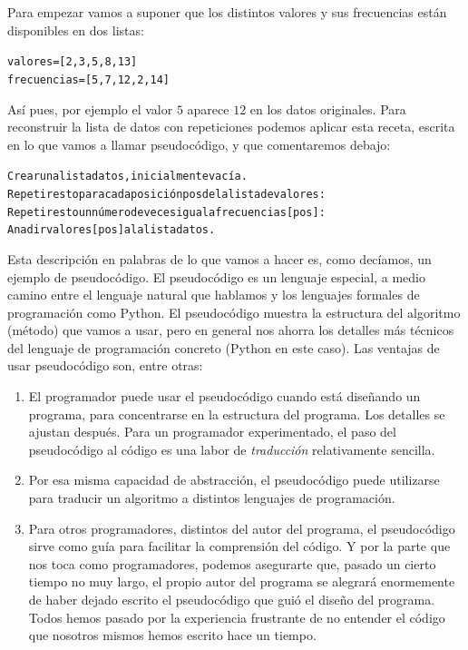 \documentclass[10pt,a4paper]{article}\usepackage[]{graphicx}\usepackage[]{color}
\makeatletter
\newenvironment{kframe}{%
 \def\at@end@of@kframe{}%
 \ifinner\ifhmode%
  \def\at@end@of@kframe{\end{minipage}}%
  \begin{minipage}{\columnwidth}%
 \fi\fi%
 \def\FrameCommand##1{\hskip\@totalleftmargin \hskip-\fboxsep
 \colorbox{shadecolor}{##1}\hskip-\fboxsep
     \hskip-\linewidth \hskip-\@totalleftmargin \hskip\columnwidth}%
 \MakeFramed {\advance\hsize-\width
   \@totalleftmargin\z@ \linewidth\hsize
   \@setminipage}}%
 {\par\unskip\endMakeFramed%
 \at@end@of@kframe}
\newenvironment{knitrout}{}{} %
\makeatother
\begin{document}
Para empezar vamos a suponer que los distintos valores y sus frecuencias están disponibles en dos listas:
\begin{knitrout}
\color{fgcolor}\begin{kframe}
\begin{alltt}
valores = [2,3,5,8,13]
frecuencias = [5,7,12,2,14]
\end{alltt}
\end{kframe}
\end{knitrout}
Así pues, por ejemplo el valor $5$ aparece $12$ en los datos originales. Para reconstruir la lista de datos con repeticiones podemos aplicar esta receta, escrita en lo que vamos a llamar {\sf pseudocódigo}, y que comentaremos debajo:
\begin{knitrout}
\color{fgcolor}\begin{kframe}
\begin{alltt}
Crear una lista datos, inicialmente vacía.
Repetir esto para cada posición pos de la lista de valores:
  Repetir esto un número de veces igual a frecuencias[pos]:
    Anadir valores[pos] a la lista datos.
\end{alltt}
\end{kframe}
\end{knitrout}
Esta descripción en palabras de lo que vamos a hacer es, como decíamos, un ejemplo de  pseudocódigo. El pseudocódigo es un lenguaje especial, a medio camino entre el lenguaje natural que hablamos y los lenguajes formales de programación como Python. El pseudocódigo muestra la estructura del algoritmo (método) que vamos a usar, pero en general nos ahorra los detalles más técnicos del lenguaje de programación concreto (Python en este caso). Las ventajas de usar pseudocódigo son, entre otras:
  \begin{enumerate}
\item  El programador puede usar el pseudocódigo cuando está diseñando un programa, para concentrarse en la estructura del programa. Los detalles se ajustan después. Para un programador experimentado, el paso del pseudocódigo al código es una labor de {\em traducción} relativamente sencilla.

\item Por esa misma capacidad de abstracción, el pseudocódigo puede utilizarse para traducir un algoritmo a distintos lenguajes de programación. 

\item Para otros programadores, distintos del autor del programa, el pseudocódigo sirve como guía para facilitar la comprensión del código. Y por la parte que nos toca como programadores, podemos asegurarte que, pasado un cierto tiempo no muy largo, el propio autor del programa se alegrará enormemente de haber dejado escrito el pseudocódigo que guió el diseño del programa. Todos hemos pasado por la experiencia frustrante de no entender el código que nosotros mismos hemos escrito hace un tiempo. 
\end{enumerate}
\end{document}
